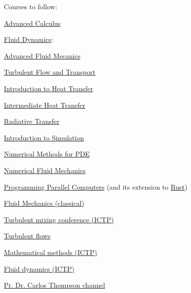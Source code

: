 Courses to follow:
\begin{todolist}
	\item\href{https://ocw.mit.edu/courses/mathematics/18-075-advanced-calculus-for-engineers-fall-2004/}{Advanced Calculus}
	\item\href{https://ocw.mit.edu/courses/mechanical-engineering/2-06-fluid-dynamics-spring-2013/}{Fluid Dynamics}:
	\item\href{https://ocw.mit.edu/courses/mechanical-engineering/2-25-advanced-fluid-mechanics-fall-2013/}{Advanced Fluid Mecanics}
	\item\href{https://ocw.mit.edu/courses/mechanical-engineering/2-27-turbulent-flow-and-transport-spring-2002/}{Turbulent Flow and Transport}
	\item\href{https://ocw.mit.edu/courses/mechanical-engineering/2-051-introduction-to-heat-transfer-fall-2015/}{Introduction to Heat Transfer}
	\item\href{https://ocw.mit.edu/courses/mechanical-engineering/2-51-intermediate-heat-and-mass-transfer-fall-2008/}{Intermediate Heat Transfer}
	\item\href{https://ocw.mit.edu/courses/mechanical-engineering/2-58j-radiative-transfer-spring-2006/}{Radiative Transfer}
	\item\href{https://ocw.mit.edu/courses/electrical-engineering-and-computer-science/6-336j-introduction-to-numerical-simulation-sma-5211-fall-2003/}{Introduction to Simulation}
	\item\href{https://ocw.mit.edu/courses/aeronautics-and-astronautics/16-920j-numerical-methods-for-partial-differential-equations-sma-5212-spring-2003/}{Numerical Methods for PDE}
	\item\href{https://ocw.mit.edu/courses/mechanical-engineering/2-29-numerical-fluid-mechanics-spring-2015/}{Numerical Fluid Mechanics}
	\item\href{https://ppc.cs.aalto.fi/}{Programming Parallel Computers} (and its extension to \href{https://github.com/parallel-rust-cpp}{Rust})
	\item\href{https://www.youtube.com/playlist?list=PLfF--3o8i4r82vJ0kjCVYgqKgyVM5QwN0}{Fluid Mechanics (classical)}
	\item\href{https://www.youtube.com/playlist?list=PL6S8U84PCLB27bdd15l1xnTSQKf3AOOoj}{Turbulent mixing conference (ICTP)}
	\item\href{https://www.youtube.com/playlist?list=PL80xBr8Wq0b5qXRPwyTxmGDOhO4obKOiC}{Turbulent flows}
	\item\href{https://www.youtube.com/playlist?list=PLp0hSY2uBeP8rhCbecD1Icahfbr6GSZ19}{Mathematical methods (ICTP)}
	\item\href{https://www.youtube.com/playlist?list=PLp0hSY2uBeP_7jL7uqlsxDmvimK2q6eF5}{Fluid dynamics (ICTP)}
	\item\href{https://www.youtube.com/channel/UCYlD7XynaJIBuYvmXlRBtnQ}{Pr. Dr. Carlos Thompson channel}
\end{todolist}

